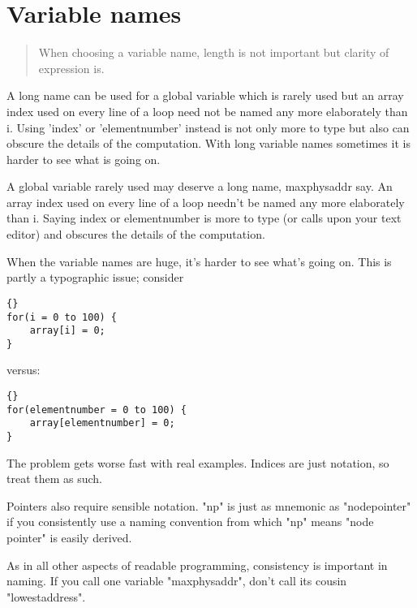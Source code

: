 \documentclass{report}
\begin{document}
\section{Variable names} 
\begin{quote}
When choosing a variable name, length is not important but clarity of expression is.
\end{quote}
A long name can be used for a global variable which is rarely used but an array index used on every line of a loop need not be named any more elaborately than i. Using 'index' or 'elementnumber' instead is not only more to type but also can obscure the details of the computation. With long variable names sometimes it is harder to see what is going on.

A global variable rarely used may deserve a long name, maxphysaddr say. An array index used on every line of a loop needn't be named any more elaborately than i. Saying index or elementnumber is more to type (or calls upon your text editor) and obscures the details of the computation.

When the variable names are huge, it's harder to see what's going on. This is partly a typographic issue; consider 
\begin{lstlisting}{}
for(i = 0 to 100) {
    array[i] = 0;
}
\end{lstlisting}
versus:
\begin{lstlisting}{}
for(elementnumber = 0 to 100) {
    array[elementnumber] = 0;
}
\end{lstlisting}
The problem gets worse fast with real examples. Indices are just notation, so treat them as such. 

Pointers also require sensible notation. "np" is just as mnemonic as "nodepointer" if you consistently use a naming convention from which "np" means "node pointer" is easily derived.

As in all other aspects of readable programming, consistency is important in naming. If you call one variable "maxphysaddr", don't call its cousin "lowestaddress". 

\end{document}

